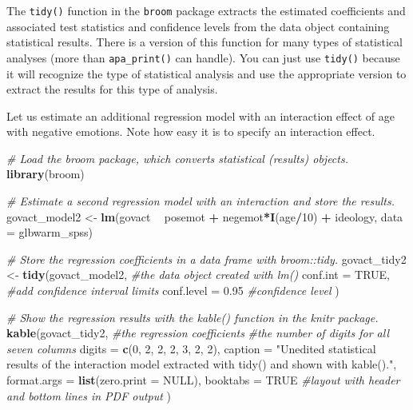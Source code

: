 \documentclass[doc,floatsintext]{apa6}
\newenvironment{Shaded}{\begin{snugshade}}{\end{snugshade}}
\newcommand{\KeywordTok}[1]{\textcolor[rgb]{0.13,0.29,0.53}{\textbf{#1}}}
\newcommand{\DataTypeTok}[1]{\textcolor[rgb]{0.13,0.29,0.53}{#1}}
\newcommand{\DecValTok}[1]{\textcolor[rgb]{0.00,0.00,0.81}{#1}}
\newcommand{\FloatTok}[1]{\textcolor[rgb]{0.00,0.00,0.81}{#1}}
\newcommand{\StringTok}[1]{\textcolor[rgb]{0.31,0.60,0.02}{#1}}
\newcommand{\CommentTok}[1]{\textcolor[rgb]{0.56,0.35,0.01}{\textit{#1}}}
\newcommand{\OtherTok}[1]{\textcolor[rgb]{0.56,0.35,0.01}{#1}}
\newcommand{\OperatorTok}[1]{\textcolor[rgb]{0.81,0.36,0.00}{\textbf{#1}}}
\newcommand{\NormalTok}[1]{#1}
\begin{document}
The \texttt{tidy()} function in the \texttt{broom} package extracts the
estimated coefficients and associated test statistics and confidence
levels from the data object containing statistical results. There is a
version of this function for many types of statistical analyses (more
than \texttt{apa\_print()} can handle). You can just use \texttt{tidy()}
because it will recognize the type of statistical analysis and use the
appropriate version to extract the results for this type of analysis.

Let us estimate an additional regression model with an interaction
effect of age with negative emotions. Note how easy it is to specify an
interaction effect.

\begin{Shaded}
\begin{Highlighting}[]
\CommentTok{# Load the broom package, which converts statistical (results) objects.}
\KeywordTok{library}\NormalTok{(broom)}

\CommentTok{# Estimate a second regression model with an interaction and store the results.}
\NormalTok{govact_model2 <-}\StringTok{ }\KeywordTok{lm}\NormalTok{(govact }\OperatorTok{~}\StringTok{ }\NormalTok{posemot }\OperatorTok{+}\StringTok{ }\NormalTok{negemot}\OperatorTok{*}\KeywordTok{I}\NormalTok{(age}\OperatorTok{/}\DecValTok{10}\NormalTok{) }\OperatorTok{+}\StringTok{ }\NormalTok{ideology,}
                   \DataTypeTok{data =}\NormalTok{ glbwarm_spss)}

\CommentTok{# Store the regression coefficients in a data frame with broom::tidy.}
\NormalTok{govact_tidy2 <-}\StringTok{ }\KeywordTok{tidy}\NormalTok{(govact_model2, }\CommentTok{#the data object created with lm()}
                    \DataTypeTok{conf.int =} \OtherTok{TRUE}\NormalTok{, }\CommentTok{#add confidence interval limits}
                    \DataTypeTok{conf.level =} \FloatTok{0.95} \CommentTok{#confidence level}
\NormalTok{                    )}

\CommentTok{# Show the regression results with the kable() function in the knitr package.}
\KeywordTok{kable}\NormalTok{(govact_tidy2, }\CommentTok{#the regression coefficients}
      \CommentTok{#the number of digits for all seven columns}
      \DataTypeTok{digits =} \KeywordTok{c}\NormalTok{(}\DecValTok{0}\NormalTok{, }\DecValTok{2}\NormalTok{, }\DecValTok{2}\NormalTok{, }\DecValTok{2}\NormalTok{, }\DecValTok{3}\NormalTok{, }\DecValTok{2}\NormalTok{, }\DecValTok{2}\NormalTok{), }
      \DataTypeTok{caption =} \StringTok{"Unedited statistical results of the interaction model }
\StringTok{                 extracted with tidy() and shown with kable()."}\NormalTok{,}
      \DataTypeTok{format.args =} \KeywordTok{list}\NormalTok{(}\DataTypeTok{zero.print =} \OtherTok{NULL}\NormalTok{),}
      \DataTypeTok{booktabs =} \OtherTok{TRUE} \CommentTok{#layout with header and bottom lines in PDF output}
\NormalTok{      )}
\end{Highlighting}
\end{Shaded}
\end{document}
